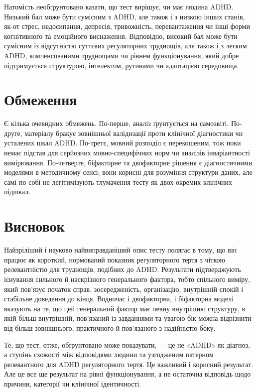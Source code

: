 \documentclass[11pt,a4paper]{article}
\begin{document}
Натомість необґрунтовано казати, що тест вирішує, чи має людина ADHD. Низький бал може бути сумісним з ADHD, але також і з низкою інших станів, як-от стрес, недосипання, депресія, тривожність, перевантаження чи інші форми когнітивного та емоційного виснаження. Відповідно, високий бал може бути сумісним із відсутністю суттєвих регуляторних труднощів, але також і з легким ADHD, компенсованими труднощами чи рівнем функціонування, який добре підтримується структурою, інтелектом, рутинами чи адаптацією середовища.

\section{Обмеження}
Є кілька очевидних обмежень. По-перше, аналіз ґрунтується на самозвіті. По-друге, матеріалу бракує зовнішньої валідизації проти клінічної діагностики чи усталених шкал ADHD. По-третє, мовний розподіл є перекошеним, тож поки немає підстав для серйозних мовно-специфічних норм чи аналізів інваріантності вимірювання. По-четверте, біфакторне та двофакторне рішення є діагностичними моделями в методичному сенсі; вони корисні для розуміння структури даних, але самі по собі не легітимізують тлумачення тесту як двох окремих клінічних підшкал.

\section{Висновок}
Найзріліший і науково найвиправданіший опис тесту полягає в тому, що він працює як короткий, нормований показник регуляторного тертя з чіткою релевантністю для труднощів, подібних до ADHD. Результати підтверджують існування сильного й наскрізного генерального фактора, тобто спільного виміру, який пов'язує початок справ, зосередженість, організацію, внутрішній спокій і стабільне доведення до кінця. Водночас і двофакторна, і біфакторна моделі вказують на те, що цей генеральний фактор має певну внутрішню структуру, в якій більш внутрішній, пов'язаний із завданнями та увагою бік можна відрізнити від більш зовнішнього, практичного й пов'язаного з надійністю боку.

Те, що тест, отже, обґрунтовано може показувати, --- це не «ADHD» як діагноз, а ступінь схожості між відповідями людини та узгодженим патерном релевантного для ADHD регуляторного тертя. Це важливий і корисний результат. Але це все ще результат на рівні функціонування, а не остаточна відповідь щодо причини, категорії чи клінічної ідентичності.

\printbibliography
\end{document}

